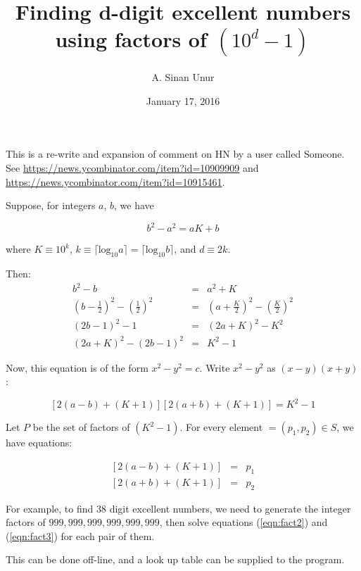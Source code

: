 \documentclass[12pt,letterpaper]{article}
\begin{document}
\title{Finding d-digit excellent numbers using factors of $(10^d - 1)$}

\author{A. Sinan Unur}

\date{January 17, 2016}

\maketitle

This is a re-write and expansion of comment on HN by a user called Someone. See \url{https://news.ycombinator.com/item?id=10909909} and \url{https://news.ycombinator.com/item?id=10915461}.

Suppose, for integers $a$, $b$, we have

\[ b^2 - a^2 = aK + b \]

where $K\equiv 10^{k}$, $k\equiv\lceil\mathrm{log}_{10}a\rceil=\lceil\mathrm{log}_{10}b\rceil$, and $d\equiv 2k$.

Then:
%
\begin{eqnarray}
%
b^2 - b & = & a^2 + K \\
%
(b - \frac{1}{2})^2 - (\frac{1}{2})^2 & = & (a + \frac{K}{2})^2 - (\frac{K}{2})^2 \\
%
(2b - 1)^2 - 1 & = & (2a + K)^2 - K^2 \\
%
(2a + K)^2 - (2b - 1)^2 & = & K^2 - 1
%
\end{eqnarray}

Now, this equation is of the form $x^2 - y^2 = c$. Write $x^2 - y^2$ as $(x - y)(x + y)$:

\begin{equation}
%
\left[2(a - b) + (K + 1)\right] \left[2(a + b) + (K + 1)\right] = K^2 - 1 \label{eqn:fact1}
%
\end{equation}

Let $P$ be the set of factors of $(K^2 - 1)$. For every element $ = (p_1,p_2)\in S$, we have equations:

\begin{eqnarray}
%
\left[2(a - b) + (K + 1)\right] & = & p_1 \label{eqn:fact2}\\
%
\left[2(a + b) + (K + 1)\right] & = & p_2 \label{eqn:fact3}
%
\end{eqnarray}

For example, to find 38 digit excellent numbers, we need to generate the integer factors of $999,999,999,999,999,999$, then solve equations (\ref{eqn:fact2}) and (\ref{eqn:fact3}) for each pair of them.

This can be done off-line, and a look up table can be supplied to the program.
\end{document}
